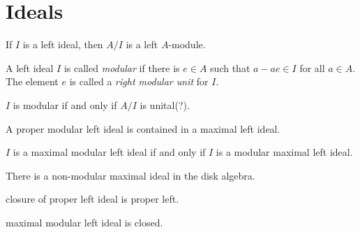 \documentclass{../../large}
\begin{document}
\section{Ideals}
\begin{prb}[Ideals]
\begin{parts}
\item If $I$ is a left ideal, then $A/I$ is a left $A$-module.
\end{parts}
\end{prb}

\begin{prb}
A left ideal $I$ is called \emph{modular} if there is $e\in A$ such that $a-ae\in I$ for all $a\in A$.
The element $e$ is called a \emph{right modular unit} for $I$.
\begin{parts}
\item $I$ is modular if and only if $A/I$ is unital(?).
\item A proper modular left ideal is contained in a maximal left ideal.
\item $I$ is a maximal modular left ideal if and only if $I$ is a modular maximal left ideal.
\item There is a non-modular maximal ideal in the disk algebra.
\end{parts}
\end{prb}

\begin{prb}
\begin{parts}
\item closure of proper left ideal is proper left.
\item maximal modular left ideal is closed.
\end{parts}
\end{prb}
\end{document}
